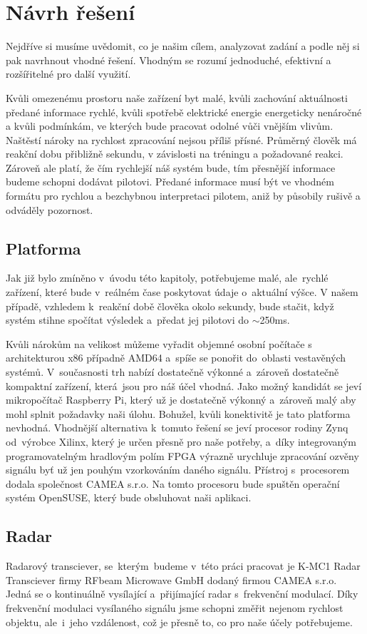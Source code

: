 \chapter{Návrh řešení}\label{navrhReseni}
	Nejdříve si musíme uvědomit, co je našim cílem, analyzovat zadání a podle něj si pak navrhnout vhodné řešení. Vhodným se rozumí jednoduché, efektivní a rozšířitelné pro další využití.\par
	Kvůli omezenému prostoru naše zařízení byt malé, kvůli zachování aktuálnosti předané informace rychlé, kvůli spotřebě elektrické energie energeticky nenáročné a kvůli podmínkám, ve kterých bude pracovat odolné vůči vnějším vlivům. Naštěstí nároky na rychlost zpracování nejsou příliš přísné. Průměrný člověk má reakční dobu přibližně sekundu, v závislosti na tréningu a požadované reakci. Zároveň ale platí, že čím rychlejší náš systém bude, tím přesnější informace budeme schopni dodávat pilotovi. Předané informace musí být ve vhodném formátu pro rychlou a bezchybnou interpretaci pilotem, aniž by působily rušivě a odváděly pozornost.
	
	\section{Platforma}\label{navrhReseni::platforma}
		Jak již bylo zmíněno v~úvodu této kapitoly, potřebujeme malé, ale~rychlé zařízení, které bude v~reálném čase poskytovat údaje o~aktuální výšce. V našem případě, vzhledem k~reakční době člověka okolo sekundy, bude stačit, když systém stihne spočítat výsledek a~předat jej pilotovi do $\sim$250ms.\par
		
		Kvůli nárokům na velikost můžeme vyřadit objemné osobní počítače s architekturou x86 případně AMD64 a~spíše se ponořit do~oblasti vestavěných systémů. V~současnosti trh nabízí dostatečně výkonné a~zároveň dostatečně kompaktní zařízení, která~jsou pro náš účel vhodná. Jako možný kandidát se jeví mikropočítač Raspberry Pi, který už je dostatečně výkonný a~zároveň malý aby mohl splnit požadavky naši úlohu. Bohužel, kvůli konektivitě je tato platforma nevhodná. Vhodnější alternativa k~tomuto řešení se jeví procesor rodiny Zynq od~výrobce Xilinx, který je určen přesně pro naše potřeby, a~díky integrovaným programovatelným hradlovým polím FPGA výrazně urychluje zpracování ozvěny signálu byť už jen pouhým vzorkováním daného signálu. Přístroj s~procesorem dodala společnost CAMEA s.r.o. Na tomto procesoru bude spuštěn operační systém OpenSUSE, který bude obsluhovat naši aplikaci.
	\section{Radar}
		Radarový transciever, se~kterým~budeme v~této práci pracovat je K-MC1 Radar Transciever firmy RFbeam Microwave GmbH dodaný firmou CAMEA s.r.o. Jedná se o kontinuálně vysílající a~přijímající radar s~frekvenční modulací. Díky frekvenční modulaci vysílaného signálu jsme schopni změřit nejenom rychlost objektu, ale~i~jeho vzdálenost, což je přesně to, co pro naše účely potřebujeme.
	
